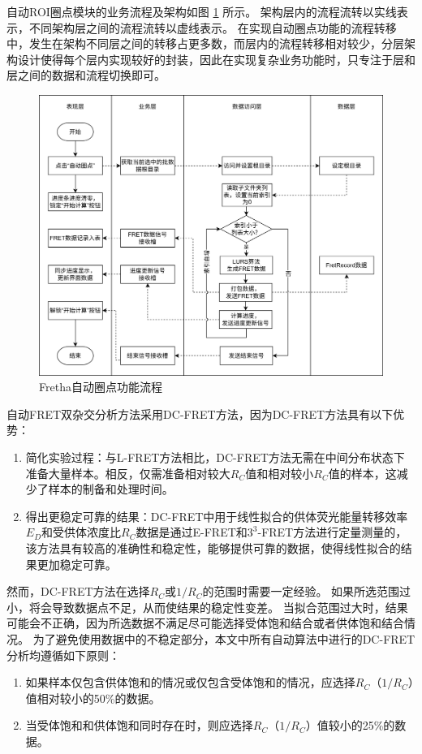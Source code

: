 自动ROI圈点模块的业务流程及架构如图 \ref{fig:fret_auto_roi_flow} 所示。
架构层内的流程流转以实线表示，不同架构层之间的流程流转以虚线表示。
在实现自动圈点功能的流程转移中，发生在架构不同层之间的转移占更多数，而层内的流程转移相对较少，分层架构设计使得每个层内实现较好的封装，因此在实现复杂业务功能时，只专注于层和层之间的数据和流程切换即可。
\begin{figure}[htbp]
    \centering
    \includegraphics[width=1\linewidth]{../figures/2/2_自动ROI圈点模块业务流程.png}
    \caption{Fretha自动圈点功能流程}
    \label{fig:fret_auto_roi_flow}
\end{figure}

自动FRET双杂交分析方法采用DC-FRET方法，因为DC-FRET方法具有以下优势：
\begin{enumerate}
    \item 简化实验过程：与L-FRET方法相比，DC-FRET方法无需在中间分布状态下准备大量样本。相反，仅需准备相对较大$R_C$值和相对较小$R_C$值的样本，这减少了样本的制备和处理时间。
    \item 得出更稳定可靠的结果：DC-FRET中用于线性拟合的供体荧光能量转移效率$E_D$和受供体浓度比$R_C$数据是通过E-FRET和$3^3$-FRET方法进行定量测量的，该方法具有较高的准确性和稳定性，能够提供可靠的数据，使得线性拟合的结果更加稳定可靠。
\end{enumerate}

然而，DC-FRET方法在选择$R_C$或$1/R_C$的范围时需要一定经验。
如果所选范围过小，将会导致数据点不足，从而使结果的稳定性变差。
当拟合范围过大时，结果可能会不正确，因为所选数据不满足尽可能选择受体饱和结合或者供体饱和结合情况。
为了避免使用数据中的不稳定部分，本文中所有自动算法中进行的DC-FRET分析均遵循如下原则：
\begin{enumerate}
    \item 如果样本仅包含供体饱和的情况或仅包含受体饱和的情况，应选择$R_C$（$1/R_C$）值相对较小的50\%的数据。
    \item 当受体饱和和供体饱和同时存在时，则应选择$R_C$（$1/R_C$）值较小的25\%的数据。
\end{enumerate}

